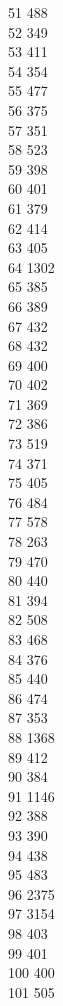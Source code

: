 { 51	488 \\
 52	349 \\
 53	411 \\
 54	354 \\
 55	477 \\
 56	375 \\
 57	351 \\
 58	523 \\
 59	398 \\
 60	401 \\
 61	379 \\
 62	414 \\
 63	405 \\
 64	1302 \\
 65	385 \\
 66	389 \\
 67	432 \\
 68	432 \\
 69	400 \\
 70	402 \\
 71	369 \\
 72	386 \\
 73	519 \\
 74	371 \\
 75	405 \\
 76	484 \\
 77	578 \\
 78	263 \\
 79	470 \\
 80	440 \\
 81	394 \\
 82	508 \\
 83	468 \\
 84	376 \\
 85	440 \\
 86	474 \\
 87	353 \\
 88	1368 \\
 89	412 \\
 90	384 \\
 91	1146 \\
 92	388 \\
 93	390 \\
 94	438 \\
 95	483 \\
 96	2375 \\
 97	3154 \\
 98	403 \\
 99	401 \\
 100	400 \\
 101	505 \\
}
